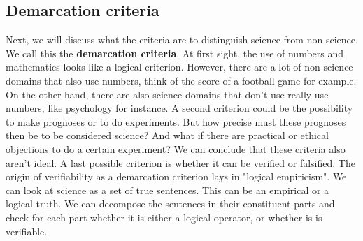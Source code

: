 \documentclass[../summary.tex]{subfiles}
\begin{document}
	\subsection{Demarcation criteria}
	
	Next, we will discuss what the criteria are to distinguish science from non-science. We call this the \textbf{demarcation criteria}. At first sight, the use of numbers and mathematics looks like a logical criterion. However, there are a lot of non-science domains that also use numbers, think of the score of a football game for example. On the other hand, there are also science-domains that don't use really use numbers, like psychology for instance. A second criterion could be the possibility to make prognoses or to do experiments. But how precise must these prognoses then be to be considered science? And what if there are practical or ethical objections to do a certain experiment? We can conclude that these criteria also aren't ideal. A last possible criterion is whether it can be verified or falsified. The origin of verifiability as a demarcation criterion lays in "logical empiricism". We can look at science as a set of true sentences. This can be an empirical or a logical truth. We can decompose the sentences in their constituent parts and check for each part whether it is either a logical operator, or whether is is verifiable.
	
\end{document}
